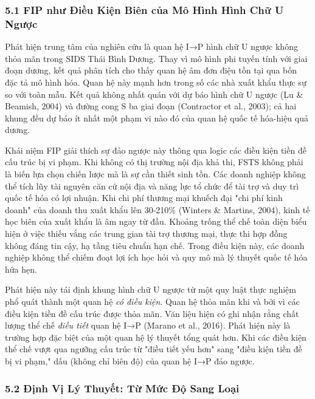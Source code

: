 \documentclass[12pt,a4paper]{article}
\begin{document}
\hypertarget{51-fip-nhux1b0-ux111iux1ec1u-kiux1ec7n-biuxean-cux1ee7a-muxf4-huxecnh-huxecnh-chux1eef-u-ngux1b0ux1ee3c}{%
\subsubsection{5.1 FIP như Điều Kiện Biên của Mô Hình Hình Chữ U
Ngược}\label{51-fip-nhux1b0-ux111iux1ec1u-kiux1ec7n-biuxean-cux1ee7a-muxf4-huxecnh-huxecnh-chux1eef-u-ngux1b0ux1ee3c}}

Phát hiện trung tâm của nghiên cứu là quan hệ I→P hình chữ U ngược không
thỏa mãn trong SIDS Thái Bình Dương. Thay vì mô hình phi tuyến tính với
giai đoạn dương, kết quả phân tích cho thấy quan hệ âm đơn điệu tồn tại
qua bốn đặc tả mô hình hóa. Quan hệ này mạnh hơn trong số các nhà xuất
khẩu thực sự so với toàn mẫu. Kết quả không nhất quán với dự báo hình
chữ U ngược (Lu \& Beamish, 2004) và đường cong S ba giai đoạn
(Contractor et al., 2003); cả hai khung đều dự báo ít nhất một phạm vi
nào đó của quan hệ quốc tế hóa-hiệu quả dương.

Khái niệm FIP giải thích sự đảo ngược này thông qua logic các điều kiện
tiền đề cấu trúc bị vi phạm. Khi không có thị trường nội địa khả thi,
FSTS không phải là biến lựa chọn chiến lược mà là sự cần thiết sinh tồn.
Các doanh nghiệp không thể tích lũy tài nguyên căn cứ nội địa và năng
lực tổ chức để tài trợ và duy trì quốc tế hóa có lợi nhuận. Khi chi phí
thương mại khuếch đại "chi phí kinh doanh" của doanh thu xuất khẩu lên
30-210\% (Winters \& Martins, 2004), kinh tế học biên của xuất khẩu là
âm ngay từ đầu. Khoảng trống thể chế toàn diện biểu hiện ở việc thiếu
vắng các trung gian tài trợ thương mại, thực thi hợp đồng không đáng tin
cậy, hạ tầng tiêu chuẩn hạn chế. Trong điều kiện này, các doanh nghiệp
không thể chiếm đoạt lợi ích học hỏi và quy mô mà lý thuyết quốc tế hóa
hứa hẹn.

Phát hiện này tái định khung hình chữ U ngược từ một quy luật thực
nghiệm phổ quát thành một quan hệ \emph{có điều kiện}. Quan hệ thỏa mãn
khi và bởi vì các điều kiện tiền đề cấu trúc được thỏa mãn. Văn liệu
hiện có ghi nhận rằng chất lượng thể chế \emph{điều tiết} quan hệ I→P
(Marano et al., 2016). Phát hiện này là trường hợp đặc biệt của một quan
hệ lý thuyết tổng quát hơn. Khi các điều kiện thể chế vượt qua ngưỡng
cấu trúc từ "điều tiết yếu hơn" sang "điều kiện tiền đề bị vi phạm," dấu
(không chỉ biên độ) của quan hệ I→P đảo ngược.

\hypertarget{52-ux111ux1ecbnh-vux1ecb-luxfd-thuyux1ebft-tux1eeb-mux1ee9c-ux111ux1ed9-sang-loux1ea1i}{%
\subsubsection{5.2 Định Vị Lý Thuyết: Từ Mức Độ Sang
Loại}\label{52-ux111ux1ecbnh-vux1ecb-luxfd-thuyux1ebft-tux1eeb-mux1ee9c-ux111ux1ed9-sang-loux1ea1i}}
\end{document}
